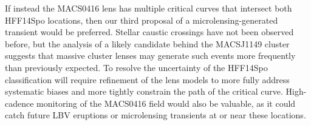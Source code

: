 \documentclass{article}
\providecommand\citep{\cite}
\def\spock{HFF14Spo\xspace}
\def\macs0416{MACS0416\xspace}
\begin{document}
If instead the \macs0416 lens has multiple critical curves that
intersect both \spock locations, then our third proposal of a
microlensing-generated transient would be preferred.  Stellar caustic
crossings have not been observed before, but the analysis of a likely
candidate behind the MACSJ1149 cluster\citep{Kelly:2017} suggests that
massive cluster lenses may generate such events more frequently than
previously expected\citep{Kelly:2017, Diego:2017}. To resolve the
uncertainty of the \spock classification will require refinement of
the lens models to more fully address systematic biases and more
tightly constrain the path of the critical curve.  High-cadence
monitoring of the \macs0416 field would also be valuable, as it could
catch future LBV eruptions or microlensing transients at or near these
locations.


\medskip
\end{document}

